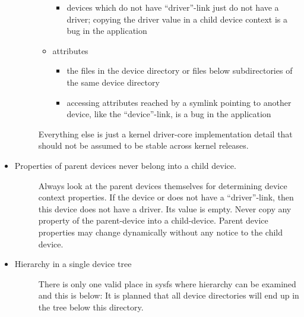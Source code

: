 \documentclass[a4paper,8pt,english]{sphinxmanual}
\begin{document}
\begin{itemize}
\begin{description}
\begin{itemize}
\begin{itemize}
\item {} 
devices which do not have ``driver''-link just do not have a
driver; copying the driver value in a child device context is a
bug in the application

\end{itemize}

\item {} 
attributes
\begin{itemize}
\item {} 
the files in the device directory or files below subdirectories
of the same device directory

\item {} 
accessing attributes reached by a symlink pointing to another device,
like the ``device''-link, is a bug in the application

\end{itemize}

\end{itemize}

Everything else is just a kernel driver-core implementation detail
that should not be assumed to be stable across kernel releases.

\end{description}

\item {} \begin{description}
\item[{Properties of parent devices never belong into a child device.}] \leavevmode
Always look at the parent devices themselves for determining device
context properties. If the device  or  does not have a
``driver''-link, then this device does not have a driver. Its value is empty.
Never copy any property of the parent-device into a child-device. Parent
device properties may change dynamically without any notice to the
child device.

\end{description}

\item {} \begin{description}
\item[{Hierarchy in a single device tree}] \leavevmode
There is only one valid place in sysfs where hierarchy can be examined
and this is below: 
It is planned that all device directories will end up in the tree
below this directory.

\end{description}


\end{itemize}
\end{document}
